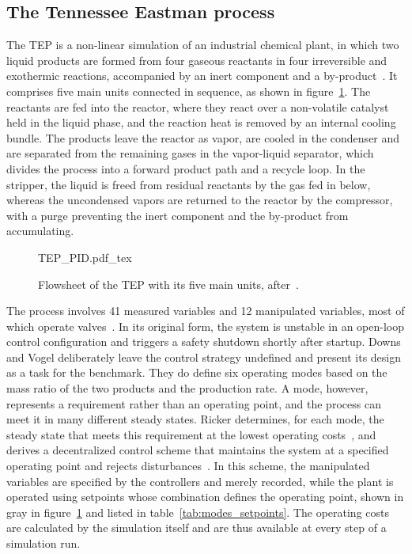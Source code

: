 \subsection{The Tennessee Eastman process} \label{subsec:tep}
%
The TEP is a non-linear simulation of an industrial chemical plant, in which two liquid products are formed from four gaseous reactants in four irreversible and exothermic reactions, accompanied by an inert component and a by-product~\cite{downs.1993}. It comprises five main units connected in sequence, as shown in figure~\ref{fig:tep_flowsheet}. The reactants are fed into the reactor, where they react over a non-volatile catalyst held in the liquid phase, and the reaction heat is removed by an internal cooling bundle. The products leave the reactor as vapor, are cooled in the condenser and are separated from the remaining gases in the vapor-liquid separator, which divides the process into a forward product path and a recycle loop. In the stripper, the liquid is freed from residual reactants by the gas fed in below, whereas the uncondensed vapors are returned to the reactor by the compressor, with a purge preventing the inert component and the by-product from accumulating. \par
%
\begin{figure}[tb]
    \centering
    \def\svgwidth{\linewidth}
    {TEP_PID.pdf_tex}
    \caption{Flowsheet of the TEP with its five main units, after~\cite{downs.1993}.}
    \label{fig:tep_flowsheet}
\end{figure}
%
The process involves 41 measured variables and 12 manipulated variables, most of which operate valves~\cite{downs.1993}. In its original form, the system is unstable in an open-loop control configuration and triggers a safety shutdown shortly after startup. Downs and Vogel deliberately leave the control strategy undefined and present its design as a task for the benchmark. They do define six operating modes based on the mass ratio of the two products and the production rate. A mode, however, represents a requirement rather than an operating point, and the process can meet it in many different steady states. Ricker determines, for each mode, the steady state that meets this requirement at the lowest operating costs~\cite{ricker.1995}, and derives a decentralized control scheme that maintains the system at a specified operating point and rejects disturbances~\cite{ricker.1996}. In this scheme, the manipulated variables are specified by the controllers and merely recorded, while the plant is operated using setpoints whose combination defines the operating point, shown in gray in figure~\ref{fig:tep_flowsheet} and listed in table~\ref{tab:modes_setpoints}. The operating costs are calculated by the simulation itself and are thus available at every step of a simulation run. \par
